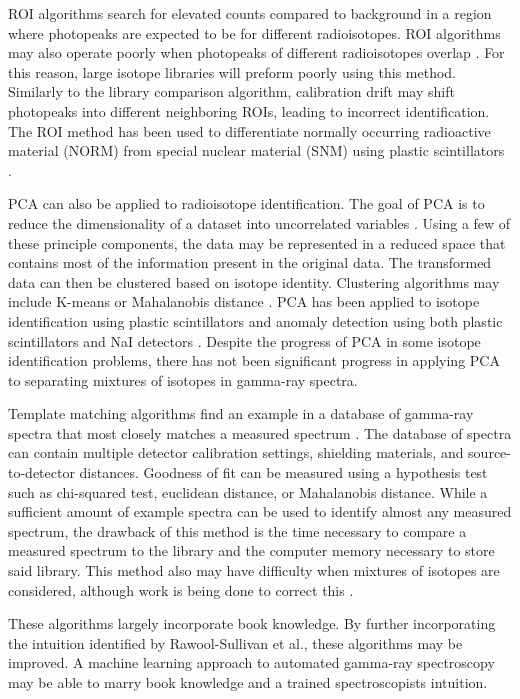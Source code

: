 \documentclass[tocnosub,noragright,centerchapter,12pt,fullpage]{uiucecethesis09}
\begin{document}
ROI algorithms search for elevated counts compared to background in a region where photopeaks are expected to be for different radioisotopes. ROI algorithms may also operate poorly when photopeaks of different radioisotopes overlap \cite{burr2009}. For this reason, large isotope libraries will preform poorly using this method. Similarly to the library comparison algorithm, calibration drift may shift photopeaks into different neighboring ROIs, leading to incorrect identification. The ROI method has been used to differentiate normally occurring radioactive material (NORM) from special nuclear material (SNM) using plastic scintillators \cite{Ely2006}.

PCA can also be applied to radioisotope identification. The goal of PCA is to reduce the dimensionality of a dataset into uncorrelated variables \cite{Jolliffe2002}. Using a few of these principle components, the data may be represented in a reduced space that contains most of the information present in the original data. The transformed data can then be clustered based on isotope identity. Clustering algorithms may include K-means or Mahalanobis distance \cite{Kanungo2002, Kumari2012}. PCA has been applied to isotope identification using plastic scintillators \cite{Boardman2012} and anomaly detection using both plastic scintillators and NaI detectors \cite{runkle2006b}. Despite the progress of PCA in some isotope identification problems, there has not been significant progress in applying PCA to separating mixtures of isotopes in gamma-ray spectra.

Template matching algorithms find an example in a database of gamma-ray spectra that most closely matches a measured spectrum \cite{burr2009}. The database of spectra can contain multiple detector calibration settings, shielding materials, and source-to-detector distances. Goodness of fit can be measured using a hypothesis test such as chi-squared test, euclidean distance, or Mahalanobis distance. While a sufficient amount of example spectra can be used to identify almost any measured spectrum, the drawback of this method is the time necessary to compare a measured spectrum to the library and the computer memory necessary to store said library. This method also may have difficulty when mixtures of isotopes are considered, although work is being done to correct this \cite{mattingly2010}.

These algorithms largely incorporate book knowledge. By further incorporating the intuition identified by Rawool-Sullivan et al., these algorithms may be improved. A machine learning approach to automated gamma-ray spectroscopy may be able to marry book knowledge and a trained spectroscopists intuition.  
\end{document}
